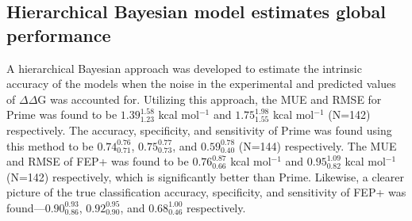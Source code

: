 \documentclass[phd,tocprelim]{cornell}
\begin{document}
\subsection{Hierarchical Bayesian model estimates global performance}
A hierarchical Bayesian approach was developed to estimate the intrinsic accuracy of the models when the noise in the experimental and predicted values of $\Delta\Delta$G was accounted for.
Utilizing this approach, the MUE and RMSE for Prime was found to be $1.39^{1.58}_{1.23}$ kcal mol$^{-1}$ and $1.75^{1.98}_{1.55}$ kcal mol$^{-1}$ (N=142) respectively.
The accuracy, specificity, and sensitivity of Prime was found using this method to be $0.74^{0.76}_{0.71}$, $0.75^{0.77}_{0.73}$, and $0.59^{0.78}_{0.40}$ (N=144) respectively.
The MUE and RMSE of FEP+ was found to be $0.76^{0.87}_{0.66}$ kcal mol$^{-1}$ and $0.95^{1.09}_{0.82}$ kcal mol$^{-1}$ (N=142) respectively, which is significantly better than Prime.
Likewise, a clearer picture of the true classification accuracy, specificity, and sensitivity of FEP+ was found---$0.90^{0.93}_{0.86}$, $0.92^{0.95}_{0.90}$, and $0.68^{1.00}_{0.46}$ respectively.
\end{document}
